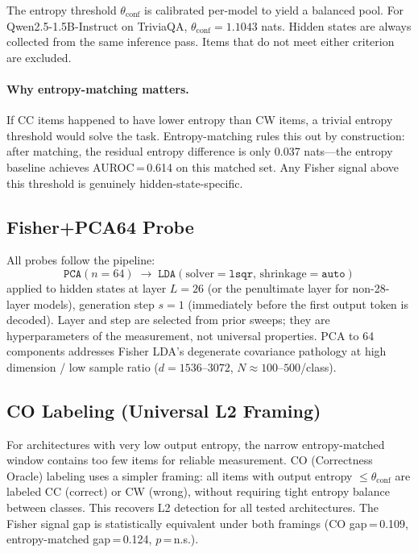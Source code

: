 \documentclass[11pt,twocolumn]{article}
\begin{document}
The entropy threshold $\theta_\text{conf}$ is calibrated per-model to yield a balanced
pool. For Qwen2.5-1.5B-Instruct on TriviaQA, $\theta_\text{conf} = 1.1043$ nats.
Hidden states are always collected from the same inference pass. Items that do not meet
either criterion are excluded.

\paragraph{Why entropy-matching matters.}
If CC items happened to have lower entropy than CW items, a trivial entropy threshold
would solve the task. Entropy-matching rules this out by construction: after matching,
the residual entropy difference is only 0.037 nats---the entropy baseline achieves
AUROC\,=\,0.614 on this matched set. Any Fisher signal above this threshold is
genuinely hidden-state-specific.

\subsection{Fisher+PCA64 Probe}

All probes follow the pipeline:
\[
\texttt{PCA}(n\!=\!64) \;\to\; \texttt{LDA}(\text{solver}=\texttt{lsqr},\, \text{shrinkage}=\texttt{auto})
\]
applied to hidden states at layer $L=26$ (or the penultimate layer for
non-28-layer models), generation step $s=1$ (immediately before the first output
token is decoded). Layer and step are selected from prior sweeps; they are
hyperparameters of the measurement, not universal properties. PCA to 64 components
addresses Fisher LDA's degenerate covariance pathology at high dimension / low sample
ratio ($d = 1536$--$3072$, $N \approx 100$--$500$/class).

\subsection{CO Labeling (Universal L2 Framing)}

For architectures with very low output entropy, the narrow entropy-matched window
contains too few items for reliable measurement. CO (Correctness Oracle) labeling
uses a simpler framing: all items with output entropy $\leq \theta_\text{conf}$ are
labeled CC (correct) or CW (wrong), without requiring tight entropy balance between
classes. This recovers L2 detection for all tested architectures. The Fisher signal
gap is statistically equivalent under both framings (CO gap\,=\,0.109,
entropy-matched gap\,=\,0.124, $p$\,=\,n.s.).
\end{document}
